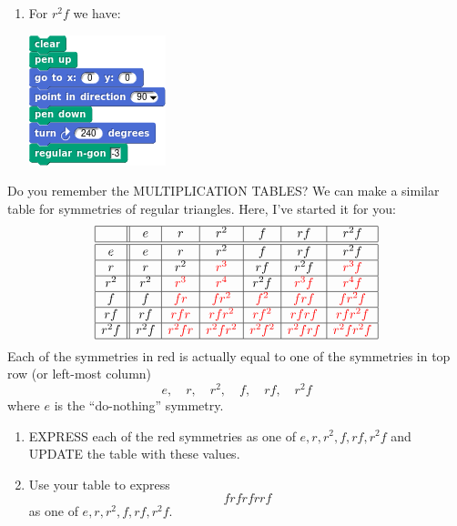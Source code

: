 \documentclass[noauthor,nooutcomes,12pt,hints]{ximera}
\begin{document}
\begin{question}
\begin{freeResponse}
\begin{enumerate}
\begin{center}
      \end{center}
    \item For $r^2f$ we have:
      \begin{center}
        \includegraphics[width=.3\textwidth]{r2fTriSCRIPT.png}   \qquad {}
      \end{center}
    \end{enumerate}
    \end{freeResponse}
\end{question}
\mynewpage


\begin{question}
  Do you remember the MULTIPLICATION TABLES? We can make a similar
  table for symmetries of regular triangles. Here, I've started it for
  you:
  \[
  \begin{array}{|c||c|c|c|c|c|c|}
    \hline
      & e & r & r^2 & f & rf & r^2f\\ \hline\hline
    e & e & r & r^2 & f & rf & r^2f\\ \hline
    r & r & r^2 & \color{red}r^3 & rf & r^2f & \color{red}r^3f\\ \hline
    r^2 & r^2 & \color{red}r^3 & \color{red}r^4 & r^2f & \color{red}r^3f &\color{red} r^4f\\ \hline
    f  & f & \color{red}fr & \color{red}fr^2 & \color{red}f^2 & \color{red}frf & \color{red}fr^2f\\ \hline
    rf & rf & \color{red}rfr & \color{red}rfr^2 & \color{red}rf^2 & \color{red}rfrf & \color{red}rfr^2f\\ \hline
    r^2f & r^2f & \color{red}r^2fr & \color{red}r^2fr^2 & \color{red}r^2f^2 &\color{red} r^2frf &\color{red} r^2fr^2f\\ \hline
  \end{array}
  \]
  Each of the symmetries in red is actually equal to one of the
  symmetries in top row (or left-most column)
  \[
  e,\quad r,\quad r^2,\quad f,\quad rf,\quad r^2f
  \]
  where $e$ is the ``do-nothing'' symmetry.
  \begin{enumerate}
    \item EXPRESS each of the red symmetries as one of
      $e,r,r^2,f,rf,r^2f$ and UPDATE the table with these values.
    \item Use your table to express
      \[
      frfrfrrf
      \]
      as one of $e,r,r^2,f,rf,r^2f$.
  \end{enumerate}
\end{question}
\end{document}
